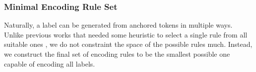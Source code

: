 \documentclass[11pt,a4paper]{article}
\newcommand{\secref}[1]{\hyperref[#1]{Section \ref*{#1}}}
\begin{document}
\subsubsection{Minimal Encoding Rule Set}
\label{sec:min_encoding}

\begin{table}
\centering
{}

\caption{The numbers of absolutely and relatively encoded node labels. Relative encodings lead to a significant reduction of classification targets in an order of magnitude across all frameworks. Note that node labels are the union of labels and property values (except for PTG), as described in \secref{sec:representation}.}
\label{tab:relative}
\end{table}

Naturally, a label can be generated from anchored tokens in multiple ways. Unlike previous works that needed some heuristic to select a single rule from all suitable ones \citep{Str:Str:19}, we do not constraint the space of the possible rules much. Instead, we construct the final set of encoding rules to be the smallest possible one capable of encoding all labels.
\end{document}

